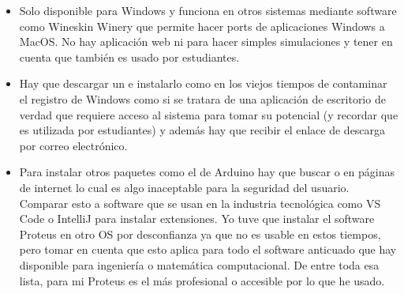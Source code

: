 \documentclass{article}
\begin{document}
    \begin{itemize}
        \item Solo disponible para Windows y funciona en otros sistemas
        mediante software como Wineskin Winery que permite hacer ports
        de aplicaciones Windows a MacOS. No hay aplicación web ni para
        hacer simples simulaciones y tener en cuenta que también es
        usado por estudiantes.

        \item Hay que descargar un  e instalarlo como en los viejos
        tiempos de contaminar el registro de Windows como si se tratara
        de una aplicación de escritorio de verdad que requiere acceso
        al sistema para tomar su potencial (y recordar que es utilizada
        por estudiantes) y además hay que recibir el enlace de descarga
        por correo electrónico.

        \item Para instalar otros paquetes como el de Arduino hay que buscar
         o  en páginas de internet lo cual es algo
        inaceptable para la seguridad del usuario. Comparar esto a
        software que se usan en la industria tecnológica como VS Code o
        IntelliJ para instalar extensiones. Yo tuve que instalar el
        software Proteus en otro OS por desconfianza ya que no es
        usable en estos tiempos, pero tomar en cuenta que esto aplica
        para todo el software anticuado que hay disponible para
        ingeniería o matemática computacional. De entre toda esa lista,
        para mi Proteus es el más profesional o accesible por lo que he
        usado.


\end{itemize}
\end{document}

